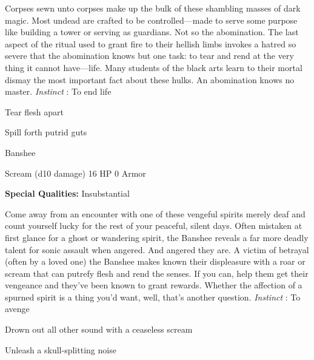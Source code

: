 \startMonsterDescription
Corpses sewn unto corpses make up the bulk of these shambling masses of dark magic.  Most undead are crafted to be controlled—made to serve some purpose like building a tower or serving as guardians.  Not so the abomination.  The last aspect of the ritual used to grant fire to their hellish limbs invokes a hatred so severe that the abomination knows but one task: to tear and rend at the very thing it cannot have—life.  Many students of the black arts learn to their mortal dismay the most important fact about these hulks. An abomination knows no master. {\em Instinct} : To end life
\stopMonsterDescription
       
\startitemize[1,packed]
         
\item Tear flesh apart

         
\item Spill forth putrid guts

       
\stopitemize
       
\startMonsterName
Banshee	 
\stopMonsterName
       

Scream (d10 damage)	16 HP	0 Armor

       


       
\startMonsterQualities
         {\bf Special Qualities:}  Insubstantial
\stopMonsterQualities
       
\startMonsterDescription
Come away from an encounter with one of these vengeful spirits merely deaf and count yourself lucky for the rest of your peaceful, silent days.  Often mistaken at first glance for a ghost or wandering spirit, the Banshee reveals a far more deadly talent for sonic assault when angered.  And angered they are. A victim of betrayal (often by a loved one) the Banshee makes known their displeasure with a roar or scream that can putrefy flesh and rend the senses.  If you can, help them get their vengeance and they’ve been known to grant rewards.  Whether the affection of a spurned spirit is a thing you’d want, well, that’s another question. {\em Instinct} : To avenge
\stopMonsterDescription
       
\startitemize[1,packed]
         
\item Drown out all other sound with a ceaseless scream

         
\item Unleash a skull-splitting noise

